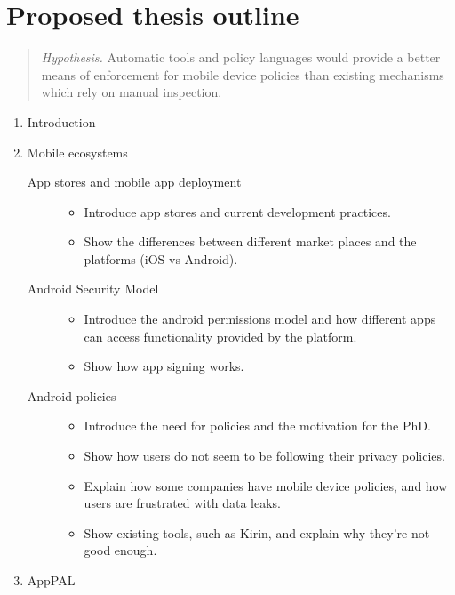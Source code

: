 \documentclass[a4paper]{scrartcl}
\begin{document}
\section{Proposed thesis outline}

\begin{quote}
  \emph{Hypothesis.} Automatic tools and policy languages would provide a
  better means of enforcement for mobile device policies than existing
  mechanisms which rely on manual inspection.
\end{quote}

\begin{enumerate}
  \item Introduction
  \item Mobile ecosystems
    \begin{description}
      \item[App stores and mobile app deployment]
        \hfill
        \begin{itemize}
          \item Introduce app stores and current development practices.
          \item Show the differences between different market places and the platforms (iOS vs Android).
        \end{itemize}
      \item[Android Security Model]
        \hfill
        \begin{itemize}
          \item Introduce the android permissions model and how different apps can access functionality provided by the platform.
          \item Show how app signing works.
        \end{itemize}
      \item[Android policies]
        \hfill
        \begin{itemize}
          \item Introduce the need for policies and the motivation for the PhD.
          \item Show how users do not seem to be following their privacy policies.
          \item Explain how some companies have mobile device policies, and how users are frustrated with data leaks.
          \item Show existing tools, such as Kirin, and explain why they're not good enough.
        \end{itemize}
    \end{description}
  \item AppPAL

\end{enumerate}
\end{document}
